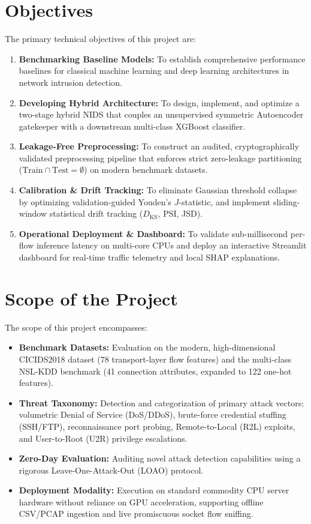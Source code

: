 \documentclass[12pt,a4paper]{report}
\begin{document}
\section{Objectives}
The primary technical objectives of this project are:
\begin{enumerate}
    \item \textbf{Benchmarking Baseline Models:} To establish comprehensive performance baselines for classical machine learning and deep learning architectures in network intrusion detection.
    \item \textbf{Developing Hybrid Architecture:} To design, implement, and optimize a two-stage hybrid NIDS that couples an unsupervised symmetric Autoencoder gatekeeper with a downstream multi-class XGBoost classifier.
    \item \textbf{Leakage-Free Preprocessing:} To construct an audited, cryptographically validated preprocessing pipeline that enforces strict zero-leakage partitioning ($\text{Train} \cap \text{Test} = \emptyset$) on modern benchmark datasets.
    \item \textbf{Calibration \& Drift Tracking:} To eliminate Gaussian threshold collapse by optimizing validation-guided Youden's $J$-statistic, and implement sliding-window statistical drift tracking ($D_{\text{KS}}$, PSI, JSD).
    \item \textbf{Operational Deployment \& Dashboard:} To validate sub-millisecond per-flow inference latency on multi-core CPUs and deploy an interactive Streamlit dashboard for real-time traffic telemetry and local SHAP explanations.
\end{enumerate}

\section{Scope of the Project}
The scope of this project encompasses:
\begin{itemize}
    \item \textbf{Benchmark Datasets:} Evaluation on the modern, high-dimensional CICIDS2018 dataset (78 transport-layer flow features) and the multi-class NSL-KDD benchmark (41 connection attributes, expanded to 122 one-hot features).
    \item \textbf{Threat Taxonomy:} Detection and categorization of primary attack vectors: volumetric Denial of Service (DoS/DDoS), brute-force credential stuffing (SSH/FTP), reconnaissance port probing, Remote-to-Local (R2L) exploits, and User-to-Root (U2R) privilege escalations.
    \item \textbf{Zero-Day Evaluation:} Auditing novel attack detection capabilities using a rigorous Leave-One-Attack-Out (LOAO) protocol.
    \item \textbf{Deployment Modality:} Execution on standard commodity CPU server hardware without reliance on GPU acceleration, supporting offline CSV/PCAP ingestion and live promiscuous socket flow sniffing.
\end{itemize}
\end{document}
